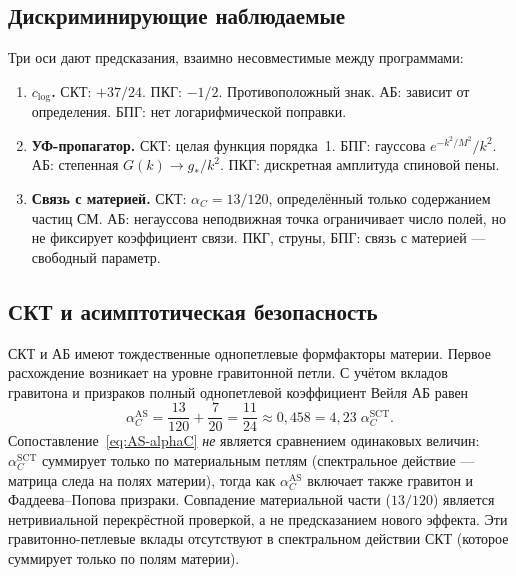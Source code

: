 \documentclass[12pt,a4paper]{article}
\theoremstyle{plain}
\theoremstyle{definition}
\theoremstyle{remark}
\begin{document}
\subsection{Дискриминирующие наблюдаемые}
\label{sec:discriminating}

Три оси дают предсказания, взаимно несовместимые между программами:
\begin{enumerate}[(1)]
\item \textbf{$c_{\log}$.} СКТ: $+37/24$. ПКГ: $-1/2$.
  Противоположный знак. АБ: зависит от определения. БПГ: нет
  логарифмической поправки.

\item \textbf{УФ-пропагатор.} СКТ: целая функция порядка~1.
  БПГ: гауссова $e^{-k^2/M^2}/k^2$. АБ: степенная
  $G(k) \to g_*/k^2$. ПКГ: дискретная амплитуда спиновой пены.

\item \textbf{Связь с материей.} СКТ: $\alpha_C = 13/120$,
  определённый только содержанием частиц СМ. АБ: негауссова
  неподвижная точка ограничивает число полей, но не фиксирует
  коэффициент связи. ПКГ, струны, БПГ: связь с материей ---
  свободный параметр.
\end{enumerate}

\subsection{СКТ и асимптотическая безопасность}
\label{sec:AS}

СКТ и АБ имеют тождественные однопетлевые формфакторы материи.
Первое расхождение возникает на уровне гравитонной петли.
С учётом вкладов гравитона и призраков полный однопетлевой
коэффициент Вейля АБ равен~\cite{SCM:2010}
\begin{equation}\label{eq:AS-alphaC}
  \alpha_C^{\mathrm{AS}} = \frac{13}{120} + \frac{7}{20}
  = \frac{11}{24} \approx 0{,}458
  = 4{,}23\;\alpha_C^{\mathrm{SCT}}.
\end{equation}
Сопоставление~\eqref{eq:AS-alphaC} \emph{не} является
сравнением одинаковых величин: $\alpha_C^{\mathrm{SCT}}$
суммирует только по материальным петлям (спектральное действие ---
матрица следа на полях материи), тогда как
$\alpha_C^{\mathrm{AS}}$ включает также гравитон и
Фаддеева--Попова призраки. Совпадение материальной части
($13/120$) является нетривиальной перекрёстной проверкой,
а не предсказанием нового эффекта.
Эти гравитонно-петлевые вклады отсутствуют в спектральном
действии СКТ (которое суммирует только по полям материи).
\end{document}
